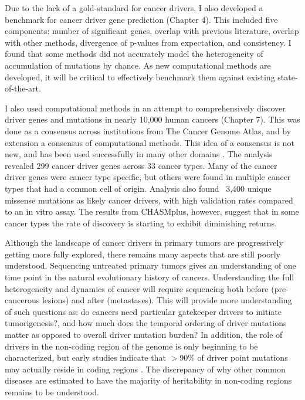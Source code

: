 Due to the lack of a gold-standard for cancer drivers, I also developed a benchmark for cancer driver gene prediction (Chapter 4). This included five components: number of significant genes, overlap with previous literature, overlap with other methods, divergence of p-values from expectation, and consistency. I found that some methods did not accurately model the heterogeneity of accumulation of mutations by chance. As new computational methods are developed, it will be critical to effectively benchmark them against existing state-of-the-art.

I also used computational methods in an attempt to comprehensively discover driver genes and mutations in nearly 10,000 human cancers (Chapter 7). This was done as a consensus across institutions from The Cancer Genome Atlas, and by extension a consensus of computational methods. This idea of a consensus is not new, and has been used successfully in many other domains \cite{RN190, RN189}. The analysis revealed 299 cancer driver genes across 33 cancer types. Many of the cancer driver genes were cancer type specific, but others were found in multiple cancer types that had a common cell of origin. Analysis also found ~3,400 unique missense mutations as likely cancer drivers, with high validation rates compared to an in vitro assay. The results from CHASMplus, however, suggest that in some cancer types the rate of discovery is starting to exhibit diminishing returns.

Although the landscape of cancer drivers in primary tumors are progressively getting more fully explored, there remains many aspects that are still poorly understood. Sequencing untreated primary tumors gives an understanding of one time point in the natural evolutionary history of cancers. Understanding the full heterogeneity and dynamics of cancer will require sequencing both before (pre-cancerous lesions) and after (metastases). This will provide more understanding of such questions as: do cancers need particular gatekeeper drivers to initiate tumorigenesis?, and how much does the temporal ordering of driver mutations matter as opposed to overall driver mutation burden? In addition, the role of drivers in the non-coding region of the genome is only beginning to be characterized, but early studies indicate that $>$90\% of driver point mutations may actually reside in coding regions \cite{RN17}. The discrepancy of why other common diseases are estimated to have the majority of heritability in non-coding regions \cite{RN192, RN193} remains to be understood.

